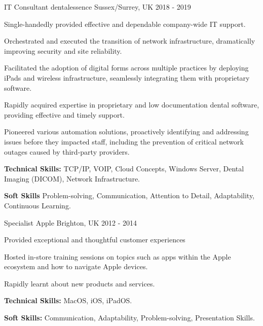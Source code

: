 \begin{cventries}
  \cventry
    {IT Consultant} %
    {dentalessence} %
    {Sussex/Surrey, UK} %
    {2018 - 2019} %
    {
      \begin{cvitems} %
        \item {Single-handedly provided effective and dependable company-wide IT support}.
        \item {Orchestrated and executed the transition of network infrastructure, dramatically improving security and site reliability.}
        \item {Facilitated the adoption of digital forms across multiple practices by deploying iPads and wireless
infrastructure, seamlessly integrating them with proprietary software.}
        \item {Rapidly acquired expertise in proprietary and low documentation dental software, providing effective and timely support.}
        \item{Pioneered various automation solutions, proactively identifying and addressing issues before they
impacted staff, including the prevention of critical network outages caused by third-party providers.}
        \item {\textbf{Technical Skills:} TCP/IP, VOIP, Cloud Concepts, Windows Server, Dental Imaging (DICOM), Network Infrastructure.}
        \item {\textbf{Soft Skills} Problem-solving, Communication, Attention to Detail, Adaptability, Continuous Learning.}
      \end{cvitems}
    }


  \cventry
    {Specialist} %
    {Apple} %
    {Brighton, UK} %
    {2012 - 2014} %
    {
      \begin{cvitems} %
        \item {Provided exceptional and thoughtful customer experiences}
        \item {Hosted in-store training sessions on topics such as apps within the Apple ecosystem and how to navigate Apple devices.}
        \item {Rapidly learnt about new products and services.}
        \item {\textbf{Technical Skills:} MacOS, iOS, iPadOS.}
        \item {\textbf{Soft Skills:} Communication, Adaptability, Problem-solving, Presentation Skills.\\}
        \smallskip
      \end{cvitems}
    }


\end{cventries}
